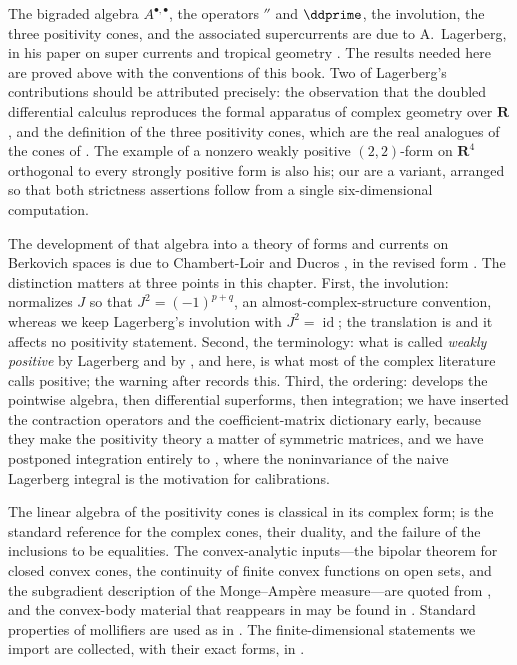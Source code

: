 The bigraded algebra $A^{\bullet,\bullet}$, the operators $\dprime$ and
$\ddprime$, the involution, the three positivity cones, and the associated
supercurrents are due to A.~Lagerberg, in his paper on super currents and
tropical geometry \cite{Lag12Super}.  The results needed here are proved
above with the conventions of this book.
Two of Lagerberg's contributions should be attributed precisely: the
observation that the doubled differential calculus reproduces the formal
apparatus of complex geometry over $\mathbf R$, and the definition of the
three positivity cones, which are the real analogues of the cones of
\cite[Ch.~III]{DemBook}.  The example of a nonzero weakly positive
$(2,2)$-form on $\mathbf R^4$ orthogonal to every strongly positive form is
also his; our
 are a variant,
arranged so that both strictness assertions follow from a single
six-dimensional computation.

The development of that algebra into a theory of forms and currents on
Berkovich spaces is due to Chambert-Loir and Ducros
\cite{CLD12}, in the revised form \cite{CLD25}.  The distinction matters at
three points in this chapter.  First, the involution: \cite{CLD25} normalizes
$J$ so that $J^2=(-1)^{p+q}$, an almost-complex-structure convention, whereas
we keep Lagerberg's involution with $J^2=\operatorname{id}$; the translation
is  and it affects no positivity statement.
Second, the terminology: what is called \emph{weakly positive} by Lagerberg
and by \cite{CLD25}, and here, is what most of the complex literature calls
positive; the warning after
 records this.  Third, the ordering:
\cite{CLD25} develops the pointwise algebra, then differential superforms,
then integration; we have inserted the contraction operators and the
coefficient-matrix dictionary early, because they make the positivity theory
a matter of symmetric matrices, and we have postponed integration entirely to
, where the noninvariance of the naive
Lagerberg integral is the motivation for calibrations.

The linear algebra of the positivity cones is classical in its complex form;
\cite[Ch.~III]{DemBook} is the standard reference for the complex cones,
their duality, and the failure of the inclusions to be equalities.  The
convex-analytic inputs---the bipolar theorem for closed convex cones, the
continuity of finite convex functions on open sets, and the subgradient
description of the Monge--Amp\`ere measure---are quoted from \cite{Roc70},
and the convex-body material that reappears in
 may be found in \cite{Sch14}.  Standard
properties of mollifiers are used as in \cite{EvansGariepy}.
The finite-dimensional statements we import are collected, with their exact
forms, in .

